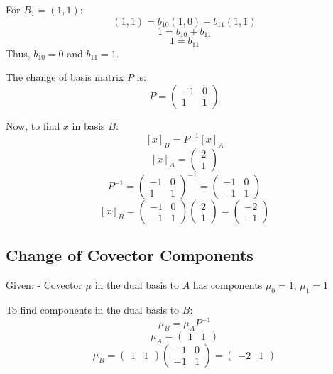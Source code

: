\documentclass{article}
\begin{document}
For \( B_1 = (1, 1) \):
\[ (1, 1) = b_{10} (1, 0) + b_{11} (1, 1) \]
\[ 1 = b_{10} + b_{11} \]
\[ 1 = b_{11} \]
Thus, \( b_{10} = 0 \) and \( b_{11} = 1 \).

The change of basis matrix \( P \) is:
\[ P = \begin{pmatrix} -1 & 0 \\ 1 & 1 \end{pmatrix} \]

Now, to find \( x \) in basis \( B \):
\[ [x]_B = P^{-1} [x]_A \]
\[ [x]_A = \begin{pmatrix} 2 \\ 1 \end{pmatrix} \]
\[ P^{-1} = \begin{pmatrix} -1 & 0 \\ 1 & 1 \end{pmatrix}^{-1} = \begin{pmatrix} -1 & 0 \\ -1 & 1 \end{pmatrix} \]
\[ [x]_B = \begin{pmatrix} -1 & 0 \\ -1 & 1 \end{pmatrix} \begin{pmatrix} 2 \\ 1 \end{pmatrix} = \begin{pmatrix} -2 \\ -1 \end{pmatrix} \]

\subsection{Change of Covector Components}

Given:
- Covector \( \mu \) in the dual basis to \( A \) has components \( \mu_0 = 1 \), \( \mu_1 = 1 \)

To find components in the dual basis to \( B \):
\[ \mu_B = \mu_A P^{-1} \]
\[ \mu_A = \begin{pmatrix} 1 & 1 \end{pmatrix} \]
\[ \mu_B = \begin{pmatrix} 1 & 1 \end{pmatrix} \begin{pmatrix} -1 & 0 \\ -1 & 1 \end{pmatrix} = \begin{pmatrix} -2 & 1 \end{pmatrix} \]
\end{document}
